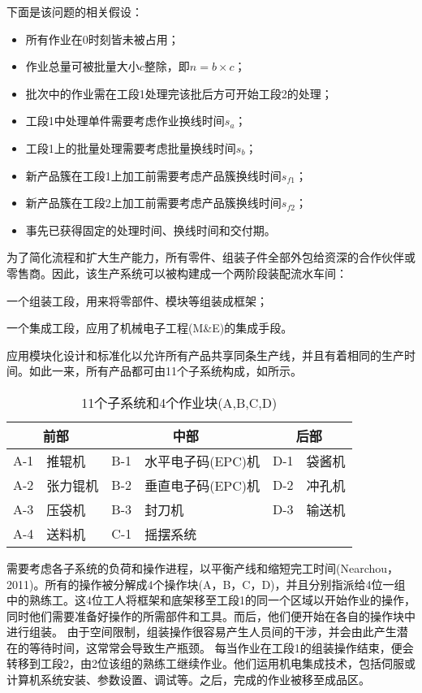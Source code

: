 下面是该问题的相关假设：
\begin{itemize}
\itemsep=0pt\parskip=0pt
\item 所有作业在0时刻皆未被占用；
\item 作业总量可被批量大小$c$整除，即$n=b\times c$；
\item 批次中的作业需在工段1处理完该批后方可开始工段2的处理；
\item 工段1中处理单件需要考虑作业换线时间$s_a$；
\item 工段1上的批量处理需要考虑批量换线时间$s_b$；
\item 新产品簇在工段1上加工前需要考虑产品簇换线时间$s_{f1}$；
\item 新产品簇在工段2上加工前需要考虑产品簇换线时间$s_{f2}$；
\item 事先已获得固定的处理时间、换线时间和交付期。
\end{itemize}
为了简化流程和扩大生产能力，所有零件、组装子件全部外包给资深的合作伙伴或零售商。因此，该生产系统可以被构建成一个两阶段装配流水车间：
\begin{inparaenum}[(1)]
\item 一个组装工段，用来将零部件、模块等组装成框架；
\item 一个集成工段，应用了机械电子工程(M\&E)的集成手段。
\end{inparaenum}
应用模块化设计和标准化以允许所有产品共享同条生产线，并且有着相同的生产时间。如此一来，所有产品都可由11个子系统构成，如所示。
\begin{table}[h]
  \centering
  \caption{11个子系统和4个作业块(A,B,C,D)}
    \begin{tabular}{llllll}
    \toprule
    \multicolumn{2}{c}{前部} & \multicolumn{2}{c}{中部} & \multicolumn{2}{c}{后部} \\
    \midrule
    A-1   & 推辊机   & B-1   & 水平电子码(EPC)机 & D-1   & 袋酱机 \\
    A-2   & 张力锟机  & B-2   & 垂直电子码(EPC)机 & D-2   & 冲孔机 \\
    A-3   & 压袋机   & B-3   & 封刀机   & D-3   & 输送机 \\
    A-4   & 送料机   & C-1   & 摇摆系统  &       &  \\
    \bottomrule
    \end{tabular}%
  \label{tab:11+4}%
\end{table}%
需要考虑各子系统的负荷和操作进程，以平衡产线和缩短完工时间(Nearchou，2011)。所有的操作被分解成4个操作块(A，B，C，D)，并且分别指派给4位一组中的熟练工。这4位工人将框架和底架移至工段1的同一个区域以开始作业的操作，同时他们需要准备好操作的所需部件和工具。而后，他们便开始在各自的操作块中进行组装。
由于空间限制，组装操作很容易产生人员间的干涉，并会由此产生潜在的等待时间，这常常会导致生产瓶颈。
每当作业在工段1的组装操作结束，便会转移到工段2，由2位该组的熟练工继续作业。他们运用机电集成技术，包括伺服或计算机系统安装、参数设置、调试等。之后，完成的作业被移至成品区。


